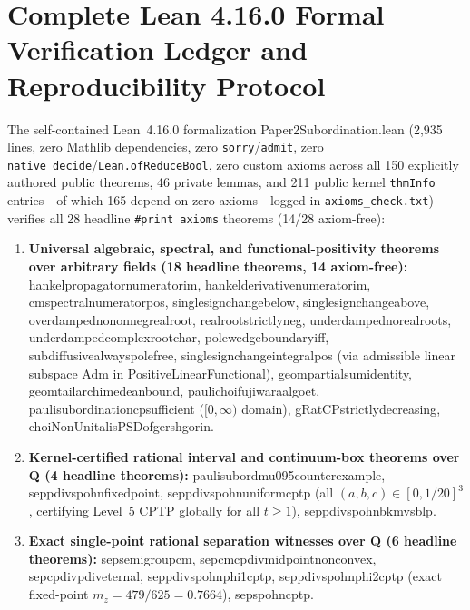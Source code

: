 \documentclass[onecolumn,10pt,notitlepage,amsmath,amssymb,floatfix]{revtex4-2}
\theoremstyle{plain}
\theoremstyle{definition}
\newcommand{\leanid}[1]{{\footnotesize\ttfamily\def\_{\textunderscore\penalty0\hspace{0pt}}#1}}
\begin{document}
\section{Complete Lean 4.16.0 Formal Verification Ledger and Reproducibility Protocol}
\label{sec:S7}

The self-contained Lean~4.16.0 formalization \leanid{Paper2\_Subordination.lean} (2,935 lines, zero Mathlib dependencies, zero \texttt{sorry}/\texttt{admit}, zero \texttt{native\_decide}/\texttt{Lean.ofReduceBool}, zero custom axioms across all 150 explicitly authored public theorems, 46 private lemmas, and 211 public kernel \texttt{thmInfo} entries---of which 165 depend on zero axioms---logged in \texttt{axioms\_check.txt}) verifies all 28 headline \texttt{\#print axioms} theorems (14/28 axiom-free):
{\raggedright
\begin{enumerate}[leftmargin=1.8em,itemsep=2pt]
\item \textbf{Universal algebraic, spectral, and functional-positivity theorems over arbitrary fields (18 headline theorems, 14 axiom-free):}
\leanid{hankel\_propagator\_numerator\_im}, \leanid{hankel\_derivative\_numerator\_im}, \leanid{cm\_spectral\_numerator\_pos}, \leanid{single\_sign\_change\_below}, \leanid{single\_sign\_change\_above}, \leanid{overdamped\_no\_nonneg\_real\_root}, \leanid{real\_root\_strictly\_neg}, \leanid{underdamped\_no\_real\_roots}, \leanid{underdamped\_complex\_root\_char}, \leanid{pole\_wedge\_boundary\_iff}, \leanid{subdiffusive\_always\_pole\_free}, \leanid{single\_sign\_change\_integral\_pos} (via admissible linear subspace \leanid{Adm} in \leanid{PositiveLinearFunctional}), \leanid{geom\_partial\_sum\_identity}, \leanid{geom\_tail\_archimedean\_bound}, \leanid{pauli\_choi\_fujiwara\_algoet}, \leanid{pauli\_subordination\_cp\_sufficient} ($[0,\infty)$ domain), \leanid{gRatCP\_strictly\_decreasing}, \leanid{choiNonUnital\_isPSD\_of\_gershgorin}.
\item \textbf{Kernel-certified rational interval and continuum-box theorems over \leanid{Q} (4 headline theorems):}
\leanid{pauli\_subord\_mu095\_counterexample}, \leanid{sep\_pdiv\_spohn\_fixed\_point}, \leanid{sep\_pdiv\_spohn\_uniform\_cptp} (all $(a,b,c) \in [0,1/20]^3$, certifying Level~5 CPTP globally for all $t \ge 1$), \leanid{sep\_pdiv\_spohn\_bkm\_vs\_blp}.
\item \textbf{Exact single-point rational separation witnesses over \leanid{Q} (6 headline theorems):}
\leanid{sep\_semigroup\_cm}, \leanid{sep\_cm\_cpdiv\_midpoint\_nonconvex}, \leanid{sep\_cpdiv\_pdiv\_eternal}, \leanid{sep\_pdiv\_spohn\_phi1\_cptp}, \leanid{sep\_pdiv\_spohn\_phi2\_cptp} (exact fixed-point $m_z = 479/625 = 0.7664$), \leanid{sep\_spohn\_cptp}.
\end{enumerate}
}
\end{document}
